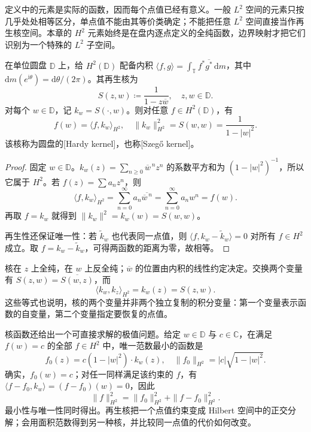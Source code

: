 定义中的元素是实际的函数，因而每个点值已经有意义。一般 \(L^2\) 空间的元素只按几乎处处相等区分，单点值不能由其等价类确定；不能把任意 \(L^2\) 空间直接当作再生核空间。本章的 \(H^2\) 元素始终是在盘内逐点定义的全纯函数，边界映射才把它们识别为一个特殊的 \(L^2\) 子空间。

\begin{theorem}[Hardy 核]\label{b3:thm:28-hardy-kernel}
在单位圆盘 \(\mathbb D\) 上，给 \(H^2(\mathbb D)\) 配备内积
\(\langle f,g\rangle=\int_{\mathbb T}f^*\overline{g^*}\,\mathrm dm\)，其中 \(\mathrm dm(e^{\mathrm i\theta})=\mathrm d\theta/(2\pi)\)。其再生核为
\begin{equation}\label{b3:eq:28-hardy-kernel}
 S(z,w)\coloneqq\frac1{1-z\overline w},
 \quad z,w\in\mathbb D.
\end{equation}
对每个 \(w\in\mathbb D\)，记 \(k_w=S(\cdot,w)\)。则对任意 \(f\in H^2(\mathbb D)\)，有
\[
 f(w)=\langle f,k_w\rangle_{H^2},
 \quad \|k_w\|_{H^2}^2=S(w,w)=\frac1{1-|w|^2}.
\]
该核称为圆盘的[Hardy kernel]，也称[Szegő kernel]。
\end{theorem}
\begin{proof}
固定 \(w\in\mathbb D\)。\(k_w(z)=\sum_{n\ge0}\overline w^{\,n}z^n\) 的系数平方和为 \((1-|w|^2)^{-1}\)，所以它属于 \(H^2\)。若 \(f(z)=\sum a_nz^n\)，则
\[
 \langle f,k_w\rangle_{H^2}
 =\sum_{n=0}^{\infty}a_n\overline{\overline w^{\,n}}
 =\sum_{n=0}^{\infty}a_nw^n=f(w).
\]
再取 \(f=k_w\) 就得到 \(\|k_w\|^2=k_w(w)=S(w,w)\)。

再生性还保证唯一性：若 \(\widetilde k_w\) 也代表同一点值，则 \(\langle f,k_w-\widetilde k_w\rangle=0\) 对所有 \(f\in H^2\) 成立。取 \(f=k_w-\widetilde k_w\)，可得两函数的距离为零，故相等。
\end{proof}

核在 \(z\) 上全纯，在 \(w\) 上反全纯；\(\overline w\) 的位置由内积的线性约定决定。交换两个变量有 \(S(z,w)=\overline{S(w,z)}\)，而
\[
 \langle k_w,k_z\rangle_{H^2}=k_w(z)=S(z,w).
\]
这些等式也说明，核的两个变量并非两个独立复制的积分变量：第一个变量表示函数的自变量，第二个变量指定要恢复的点值。

\ProseParagraphBreak
核函数还给出一个可直接求解的极值问题。给定 \(w\in\mathbb D\) 与 \(c\in\mathbb C\)，在满足 \(f(w)=c\) 的全部 \(f\in H^2\) 中，唯一范数最小的函数是
\[
 f_0(z)=c(1-|w|^2)\cdot k_w(z),
 \quad \|f_0\|_{H^2}=|c|\sqrt{1-|w|^2}.
\]
确实，\(f_0(w)=c\)；对任一同样满足该约束的 \(f\)，有 \(\langle f-f_0,k_w\rangle=(f-f_0)(w)=0\)，因此
\[
 \|f\|_{H^2}^2=\|f_0\|_{H^2}^2+\|f-f_0\|_{H^2}^2.
\]
最小性与唯一性同时得出。再生核把一个点值约束变成 Hilbert 空间中的正交分解；会用面积范数得到另一种核，并比较同一点值的代价如何改变。
